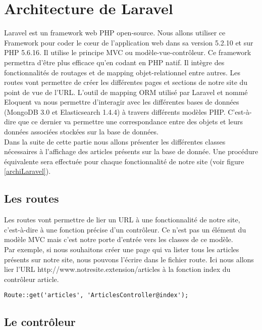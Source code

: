 \newpage
\section{Architecture de Laravel}
\label{sec:laravel}

Laravel\cite{Laravel} est un framework web PHP open-source. Nous allons utiliser ce Framework pour coder le cœur de l'application web dans sa version 5.2.10 et sur PHP 5.6.16. Il utilise le principe MVC ou modèle-vue-contrôleur. Ce framework permettra d'être plus efficace qu'en codant en PHP natif. Il intègre des fonctionnalités de routages et de mapping objet-relationnel entre autres. Les routes vont permettre de créer les différentes pages et sections de notre site du point de vue de l'URL. L'outil de mapping ORM utilisé par Laravel et nommé Eloquent va nous permettre d'interagir avec les différentes bases de données (MongoDB 3.0 et Elasticsearch 1.4.4) à travers différents modèles PHP. C'est-à-dire que ce dernier va permettre une correspondance entre des objets et leurs données associées stockées sur la base de données.\\
Dans la suite de cette partie nous allons présenter les différentes classes nécessaires à l'affichage des articles présents sur la base de donnée. Une procédure équivalente sera effectuée pour chaque fonctionnalité de notre site (voir figure \ref{archiLaravel}).

\subsection{Les routes}

Les routes vont permettre de lier un URL à une fonctionnalité de notre site, c'est-à-dire à une fonction précise d'un contrôleur. Ce n'est pas un élément du modèle MVC mais c'est notre porte d'entrée vers les classes de ce modèle.\\
Par exemple, si nous souhaitons créer une page qui va lister tous les articles présents sur notre site, nous pouvons l'écrire dans le fichier route. Ici nous allons lier l'URL http://www.notresite.extension/articles à la fonction index du contrôleur article.

\begin{verbatim}
Route::get('articles', 'ArticlesController@index');
\end{verbatim}

\subsection{Le contrôleur}

